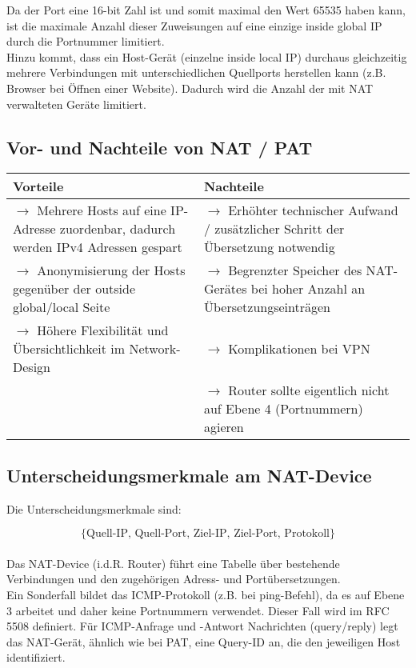 Da der Port eine 16-bit Zahl ist und somit maximal den Wert 65535 haben kann,
ist die maximale Anzahl dieser Zuweisungen auf eine einzige inside global IP
durch die Portnummer limitiert.\\

Hinzu kommt, dass ein Host-Gerät (einzelne inside local IP) durchaus
gleichzeitig mehrere Verbindungen mit unterschiedlichen Quellports herstellen
kann (z.B. Browser bei Öffnen einer Website). Dadurch wird die Anzahl der
mit NAT verwalteten Geräte limitiert.

\subsection{Vor- und Nachteile von NAT / PAT}

\begin{table}[H]
\begin{tabularx}{\textwidth}{|X|X|}
  \textbf{Vorteile} & \textbf{Nachteile}\\
  \hline
  $\rightarrow$ Mehrere Hosts auf eine IP-Adresse zuordenbar, dadurch werden IPv4 Adressen gespart & $\rightarrow$ Erhöhter technischer Aufwand / zusätzlicher Schritt der Übersetzung notwendig\\
  $\rightarrow$ Anonymisierung der Hosts gegenüber der outside global/local Seite &$\rightarrow$ Begrenzter Speicher des NAT-Gerätes bei hoher Anzahl an Übersetzungseinträgen\\
  $\rightarrow$ Höhere Flexibilität und Übersichtlichkeit im Network-Design & $\rightarrow$ Komplikationen bei VPN\\
  & $\rightarrow$ Router sollte eigentlich nicht auf Ebene 4 (Portnummern) agieren
\end{tabularx}
\end{table}

\subsection{Unterscheidungsmerkmale am NAT-Device}
Die Unterscheidungsmerkmale sind:

\[\{\text{Quell-IP, Quell-Port, Ziel-IP, Ziel-Port, Protokoll}\}\]\\

Das NAT-Device (i.d.R. Router) führt eine Tabelle über bestehende Verbindungen
und den zugehörigen Adress- und Portübersetzungen.\\

Ein Sonderfall bildet das ICMP-Protokoll (z.B. bei ping-Befehl), da es auf
Ebene 3 arbeitet und daher keine Portnummern verwendet. Dieser Fall wird im RFC
5508 definiert. Für ICMP-Anfrage und -Antwort Nachrichten (query/reply) legt
das NAT-Gerät, ähnlich wie bei PAT, eine Query-ID an, die den jeweiligen Host
identifiziert.\\

